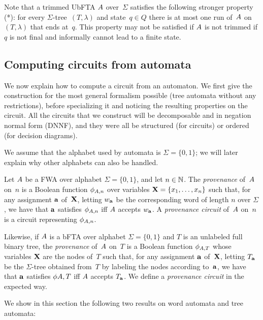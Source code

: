 Note that a trimmed UbFTA $A$ over~$\Sigma$ satisfies the following stronger
property (*):
for every
$\Sigma$-tree~$(T,\lambda)$ and state~$q \in Q$ there is at most one run
of~$A$ on~$(T,\lambda)$ that ends at~$q$. This property may not be satisfied if
$A$ is not trimmed if $q$ is not final and informally cannot lead to a finite
state.

\subsection{Computing circuits from automata}

We now explain how to compute a circuit from an automaton. We first give the
construction for the most general formalism possible (tree automata without any
restrictions), before specializing it and noticing the resulting properties on
the circuit. All the circuits that we construct will be decomposable and in
negation normal form (DNNF), and they were all be structured (for circuits) or
ordered (for decision diagrams).

We assume that the alphabet used by automata is $\Sigma = \{0, 1\}$; we will
later explain why other alphabets can also be handled.

\begin{definition}
  Let $A$ be a FWA over alphabet $\Sigma = \{0, 1\}$, and let $n \in \mathbb{N}$. The
  \emph{provenance} of~$A$ on~$n$ is a Boolean function $\phi_{A, n}$
  over variables
  $\mathbf{X} = \{x_1, \ldots, x_n\}$ such that, for any assignment $\mathbf{a}$
  of~$\mathbf{X}$, letting $w_{\mathbf{a}}$ be the corresponding word of length $n$ over
  $\Sigma$, we have that $\mathbf{a}$ satisfies $\phi_{A, n}$ iff $A$ accepts $w_{\mathbf{a}}$.
  A \emph{provenance circuit} of~$A$ on~$n$ is a circuit representing
  $\phi_{A, n}$.

  Likewise, if $A$ is a bFTA over alphabet $\Sigma = \{0, 1\}$ and $T$ is an
  unlabeled full binary tree, the \emph{provenance} of~$A$ on~$T$ is a Boolean
  function $\phi_{A, T}$ whose variables $\mathbf{X}$ are the nodes of~$T$ such that,
  for any assignment $\mathbf{a}$ of~$\mathbf{X}$, letting $T_{\mathbf{a}}$ be the $\Sigma$-tree
  obtained from~$T$ by labeling the nodes according to~$\mathbf{a}$, we have that $\mathbf{a}$
  satisfies $\phi{A, T}$ iff $A$ accepts $T_{\mathbf{a}}$. We define a \emph{provenance
  circuit} in the expected way.
\end{definition}

We show in this section the following two results on word automata and tree
automata:

